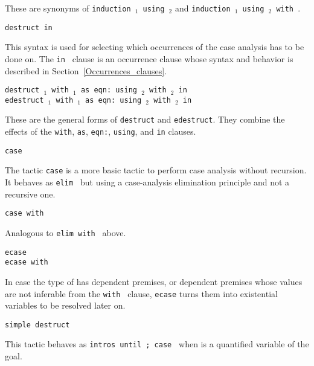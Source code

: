 \begin{coq_example*}
\begin{Variants}
  These are synonyms of {\tt induction {\term$_1$} using {\term$_2$}} and
  {\tt induction {\term$_1$} using {\term$_2$} with {\bindinglist}}.

\item \texttt{destruct {\term} in {\occgoalset}}

  This syntax is used for selecting which occurrences of {\term} the
  case analysis has to be done on. The {\tt in {\occgoalset}} clause is an
  occurrence clause whose syntax and behavior is described in
  Section~\ref{Occurrences_clauses}.

\item{\tt destruct {\term$_1$} with {\bindinglist$_1$}
        as {\disjconjintropattern} eqn:{\namingintropattern}
        using {\term$_2$} with {\bindinglist$_2$} in {\occgoalset}}\\
     {\tt edestruct {\term$_1$} with {\bindinglist$_1$}
        as {\disjconjintropattern} eqn:{\namingintropattern}
        using {\term$_2$} with {\bindinglist$_2$} in {\occgoalset}}

  These are the general forms of {\tt destruct} and {\tt edestruct}.
  They combine the effects of the {\tt with}, {\tt as}, {\tt eqn:}, {\tt using},
  and {\tt in} clauses.

\item{\tt case \term}\label{case}

  The tactic {\tt case} is a more basic tactic to perform case
  analysis without recursion. It behaves as {\tt elim \term} but using
  a case-analysis elimination principle and not a recursive one.

\item {\tt case {\term} with {\bindinglist}}

  Analogous to {\tt elim {\term} with {\bindinglist}} above.

\item{\tt ecase {\term}}\\
  {\tt ecase {\term} with {\bindinglist}}

  In case the type of {\term} has dependent premises, or dependent
  premises whose values are not inferable from the {\tt with
  {\bindinglist}} clause, {\tt ecase} turns them into existential
  variables to be resolved later on.

\item {\tt simple destruct \ident}

  This tactic behaves as {\tt intros until
    {\ident}; case {\tt {\ident}}} when {\ident} is a quantified
  variable of the goal.


\end{Variants}
\end{coq_example*}
